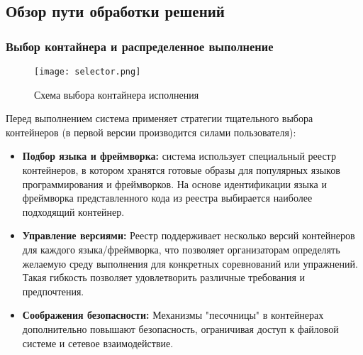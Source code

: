 

\subsection{Обзор пути обработки решений}


\subsubsection{Выбор контайнера и распределенное выполнение}
\begin{figure}[h]
    \centering
    \texttt{[image: selector.png]}
    \caption{Схема выбора контайнера исполнения}
    \noindent
\end{figure}

\noindent

Перед выполнением система применяет стратегии тщательного выбора контейнеров (в первой версии производится силами пользователя):
\begin{itemize}
    \itemsep 0em
    \item \textbf{Подбор языка и фреймворка:} система использует специальный реестр контейнеров, в котором хранятся готовые образы для популярных языков программирования и фреймворков. На основе идентификации языка и фреймворка представленного кода из реестра выбирается наиболее подходящий контейнер.
    \item \textbf{Управление версиями:} Реестр поддерживает несколько версий контейнеров для каждого языка/фреймворка, что позволяет организаторам определять желаемую среду выполнения для конкретных соревнований или упражнений. Такая гибкость позволяет удовлетворить различные требования и предпочтения.
    \item \textbf{Соображения безопасности:} Механизмы "песочницы" в контейнерах дополнительно повышают безопасность, ограничивая доступ к файловой системе и сетевое взаимодействие.
\end{itemize}

